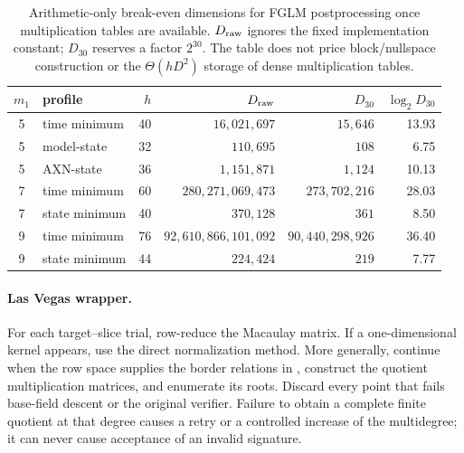 \documentclass[11pt]{article}
\begin{document}
\begin{table}[H]
\centering
\caption{Arithmetic-only break-even dimensions for FGLM postprocessing once
multiplication tables are available.  $D_{\rm raw}$ ignores the fixed
implementation constant; $D_{30}$ reserves a factor $2^{30}$.  The table does
not price block/nullspace construction or the $\Theta(hD^2)$ storage of dense
multiplication tables.}
\label{tab:quotient-extraction}
\small
\setlength{\tabcolsep}{5pt}
\begin{tabular}{@{}c l r r r r@{}}
\toprule
$m_1$ & profile & $h$ & $D_{\rm raw}$ & $D_{30}$ & $\log_2D_{30}$\\
\midrule
5 & time minimum & 40 & $16{,}021{,}697$ & $15{,}646$ & 13.93\\
5 & model-state  & 32 & $110{,}695$ & $108$ & 6.75\\
5 & AXN-state    & 36 & $1{,}151{,}871$ & $1{,}124$ & 10.13\\
\midrule
7 & time minimum & 60 & $280{,}271{,}069{,}473$ & $273{,}702{,}216$ & 28.03\\
7 & state minimum & 40 & $370{,}128$ & $361$ & 8.50\\
\midrule
9 & time minimum & 76 & $92{,}610{,}866{,}101{,}092$ & $90{,}440{,}298{,}926$ & 36.40\\
9 & state minimum & 44 & $224{,}424$ & $219$ & 7.77\\
\bottomrule
\end{tabular}
\end{table}

\paragraph{Las Vegas wrapper.}
For each target--slice trial, row-reduce the Macaulay matrix.  If a
one-dimensional kernel appears, use the direct normalization method.  More
generally, continue when the row space supplies the border relations in
, construct the quotient multiplication
matrices, and enumerate its roots.  Discard every point that fails base-field
descent or the original verifier.  Failure to obtain a complete finite quotient
at that degree causes a retry or a controlled increase of the multidegree; it
can never cause acceptance of an invalid signature.
\end{document}
